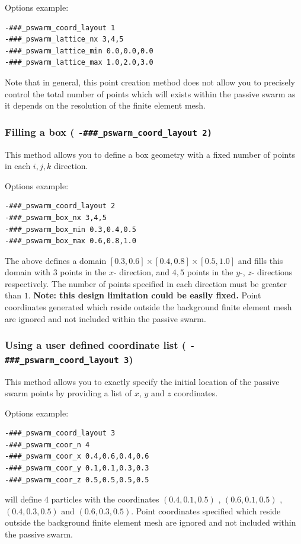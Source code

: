 \documentclass[paper=a4, fontsize=10pt,twoside]{scrartcl}
\begin{document}
{{Options example:
\begin{lstlisting}
-###_pswarm_coord_layout 1
-###_pswarm_lattice_nx 3,4,5
-###_pswarm_lattice_min 0.0,0.0,0.0
-###_pswarm_lattice_max 1.0,2.0,3.0
\end{lstlisting}

Note that in general, this point creation method does not allow you to precisely control the total number of points which
will exists within the passive swarm as it depends on the resolution of the finite element mesh.

\subsubsection{Filling a box ( \texttt{-\#\#\#\_pswarm\_coord\_layout 2)}}

This method allows you to define a box geometry with a fixed number of points in each $i,j,k$ direction.

Options example:
\begin{lstlisting}
-###_pswarm_coord_layout 2
-###_pswarm_box_nx 3,4,5
-###_pswarm_box_min 0.3,0.4,0.5
-###_pswarm_box_max 0.6,0.8,1.0
\end{lstlisting}

The above defines a domain $[0.3,0.6] \times [0.4,0.8] \times [0.5,1.0]$ and fills this domain with $3$ points in the $x$- direction, and $4,5$ points in the $y$-, $z$- directions respectively. The number of points specified in each direction must be greater than $1$.
\textbf{Note: this design limitation could be easily fixed.}
Point coordinates generated which reside outside the background finite element mesh are ignored and not included within the passive swarm.

\subsubsection{Using a user defined coordinate list ( \texttt{-\#\#\#\_pswarm\_coord\_layout 3})}

This method allows you to exactly specify the initial location of the passive swarm points by providing
a list of $x$, $y$ and $z$ coordinates.

Options example:
\begin{lstlisting}
-###_pswarm_coord_layout 3
-###_pswarm_coor_n 4
-###_pswarm_coor_x 0.4,0.6,0.4,0.6
-###_pswarm_coor_y 0.1,0.1,0.3,0.3
-###_pswarm_coor_z 0.5,0.5,0.5,0.5
\end{lstlisting}
will define 4 particles with the coordinates $(0.4,0.1,0.5)$ , $(0.6,0.1,0.5)$ , $(0.4,0.3,0.5)$ and $(0.6,0.3,0.5)$.
Point coordinates specified which reside outside the background finite element mesh are ignored and not included within the passive swarm.

}}
\end{document}
